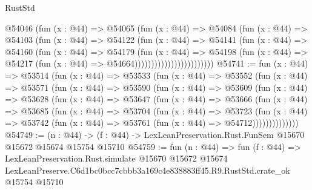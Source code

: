 \begin{lexlean}{RustStd}
\begin{coremodule}
                              @54046
                                (fun (x : @44) =>
                                @54065
                                  (fun (x : @44) =>
                                  @54084
                                    (fun (x : @44) =>
                                    @54103
                                      (fun (x : @44) =>
                                      @54122
                                        (fun (x : @44) =>
                                        @54141
                                          (fun (x : @44) =>
                                          @54160
                                            (fun (x : @44) =>
                                            @54179
                                              (fun (x : @44) =>
                                              @54198
                                                (fun (x : @44) =>
                                                @54217
                                                  (fun (x : @44) => @54664))))))))))))))))))))))))
@54741 := fun (x : @44) =>
  @53514
    (fun (x : @44) =>
    @53533
      (fun (x : @44) =>
      @53552
        (fun (x : @44) =>
        @53571
          (fun (x : @44) =>
          @53590
            (fun (x : @44) =>
            @53609
              (fun (x : @44) =>
              @53628
                (fun (x : @44) =>
                @53647
                  (fun (x : @44) =>
                  @53666
                    (fun (x : @44) =>
                    @53685
                      (fun (x : @44) =>
                      @53704
                        (fun (x : @44) =>
                        @53723
                          (fun (x : @44) =>
                          @53742 (fun (x : @44) => @53761 (fun (x : @44) => @54712))))))))))))))
@54749 := (n : @44) ->
  (f : @44) -> LexLeanPreservation.Rust.FunSem @15670 @15672 @15674 @15754 @15710
@54759 := fun (n : @44) =>
  fun (f : @44) =>
  LexLeanPreservation.Rust.simulate
    @15670
    @15672
    @15674
    LexLeanPreserve.C6d1bc0bcc7cbbb3a169c4e838883ff45.R9.RustStd.crate_ok
    @15754
    @15710
\end{coremodule}
\end{lexlean}
